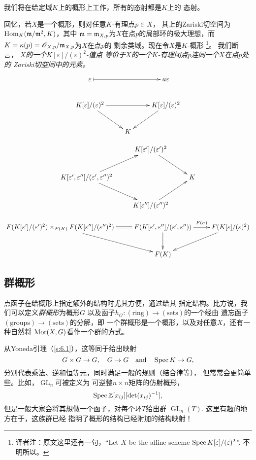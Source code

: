 我们将在给定域$K$上的概形上工作，所有的态射都是$K$上的
态射。

回忆，若$X$是一个概形，则对任意$K$-有理点$p\in X$，
其上的Zariski切空间为$\operatorname{Hom}_K(\mathfrak{m}/\mathfrak{m}^2,K)$，其中
$\mathfrak{m}=\mathfrak{m}_{X,p}$为$X$在点$p$的局部环的极大理想，而
$K=\kappa(p)=\mathscr O_{X,p}/\mathfrak{m}_{X,p}$为$X$在点$p$的
剩余类域。现在令$X$是$K$-概形%
\footnote{译者注：原文这里还有一句，“Let $X$ be the
affine scheme $\operatorname{Spec} K[\varepsilon]/(\varepsilon)^2$”.
不明所以。}。%
我们断言，
\textit{$X$的一个$K[\varepsilon]/(\varepsilon)^2$-值点
等价于$X$的一个$K$-有理闭点$p$连同一个$X$在点$p$处的
Zariski切空间中的元素。}


\[
	\xymatrix{
	\varepsilon \ar@{|->}[rr] &  & a\varepsilon\\
	K[\varepsilon]/(\varepsilon)^2 \ar[rr]\ar[rd]& & K[\varepsilon]/(\varepsilon)^2 \ar[ld]\\
	& K &
	}
\]


\[
	\xymatrix{
	& K[\varepsilon']/(\varepsilon')^2 \ar[rd] &\\
	K[\varepsilon',\varepsilon'']/(\varepsilon',\varepsilon'')^2 \ar[ru]\ar[rd]& & K\\
	& K[\varepsilon'']/(\varepsilon'')^2 \ar[ru] &
	}
\]

\[
	\xymatrix{
	F(K[\varepsilon']/(\varepsilon')^2)\times_{F(K)} F(K[\varepsilon'']/(\varepsilon'')^2)\ar[rd]\ar@{=}[r]&F(K[\varepsilon',\varepsilon'']/(\varepsilon',\varepsilon'')) \ar[r]^-{F(\sigma)}\ar[d]& F(K[\varepsilon]/(\varepsilon)^2)\ar[ld]\\
	& F(K) &
	}
\]

\subsection{群概形} \label{s:6.1.4}

点函子在给概形上指定额外的结构时尤其方便，通过给其
指定结构。比方说，我们可以定义\textit{群概形}为概形$G$
以及函子$h_G:(\text{ring})\to (\text{sets})$的一个经由
遗忘函子$(\text{groups})\to (\text{sets})$的分解，即
一个群概形是一个概形，以及对任意$X$，还有一种自然将
$\operatorname{Mor}(X,G)$看作一个群的方式。

从Yoneda引理（\ref{s:6.1}），这等同于给出映射
\[
	G\times G\to G,\quad G\to G\quad \text{and}
	\quad \operatorname{Spec} K\to G,
\]
分别代表乘法、逆和恒等元，同时满足一般的规则（结合律等），
但常常会更简单些。比如，$\operatorname{GL}_n$可被定义为
可逆整$n\times n$矩阵的仿射概形，
\[
	\operatorname{Spec} \mathbb{Z}[x_{ij}][\det (x_{ij})^{-1}],
\]
但是一般大家会将其想做一个函子，对每个环$T$给出群
$\operatorname{GL}_n(T)$. 这里有趣的地方在于，这族群已经
指明了概形的结构已经附加的结构映射！
